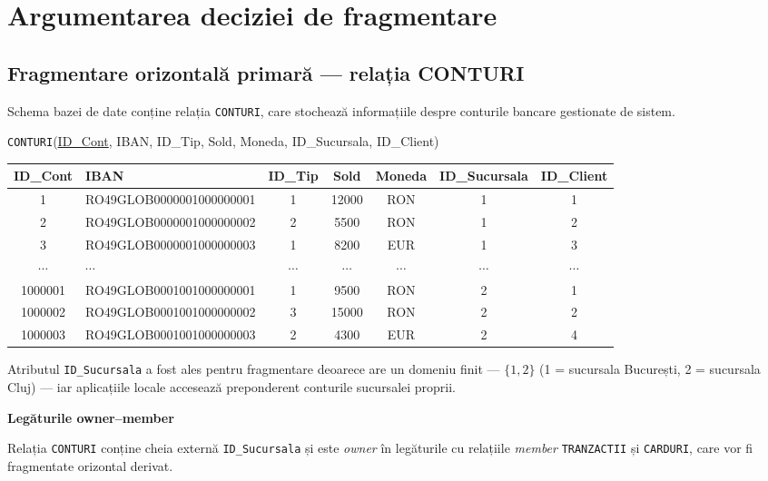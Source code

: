\documentclass[12pt,a4paper]{article}
\begin{document}
\section{Argumentarea deciziei de fragmentare}

\subsection{Fragmentare orizontală primară — relația CONTURI}

Schema bazei de date conține relația \texttt{CONTURI}, care stochează informațiile despre
conturile bancare gestionate de sistem.

\texttt{CONTURI}(\underline{ID\_Cont}, IBAN, ID\_Tip, Sold, Moneda, ID\_Sucursala, ID\_Client)

\begin{center}
\small
\begin{tabular}{c|l|c|c|c|c|c}
\toprule
ID\_Cont & IBAN & ID\_Tip & Sold & Moneda & ID\_Sucursala & ID\_Client \\
\midrule
1       & RO49GLOB0000001000000001 & 1 & 12000 & RON & 1 & 1 \\
2       & RO49GLOB0000001000000002 & 2 &  5500 & RON & 1 & 2 \\
3       & RO49GLOB0000001000000003 & 1 &  8200 & EUR & 1 & 3 \\
$\cdots$ & $\cdots$ & $\cdots$ & $\cdots$ & $\cdots$ & $\cdots$ & $\cdots$ \\
1000001 & RO49GLOB0001001000000001 & 1 &  9500 & RON & 2 & 1 \\
1000002 & RO49GLOB0001001000000002 & 3 & 15000 & RON & 2 & 2 \\
1000003 & RO49GLOB0001001000000003 & 2 &  4300 & EUR & 2 & 4 \\
\bottomrule
\end{tabular}
\end{center}

Atributul \texttt{ID\_Sucursala} a fost ales pentru fragmentare deoarece are un domeniu finit — $\{1, 2\}$
(1 = sucursala București, 2 = sucursala Cluj) — iar aplicațiile locale
accesează preponderent conturile sucursalei proprii.


\textbf{Legăturile owner--member}

Relația \texttt{CONTURI} conține cheia externă \texttt{ID\_Sucursala} și este \textit{owner}
în legăturile cu relațiile \textit{member} \texttt{TRANZACTII} și \texttt{CARDURI}, care vor
fi fragmentate orizontal derivat.
\end{document}
